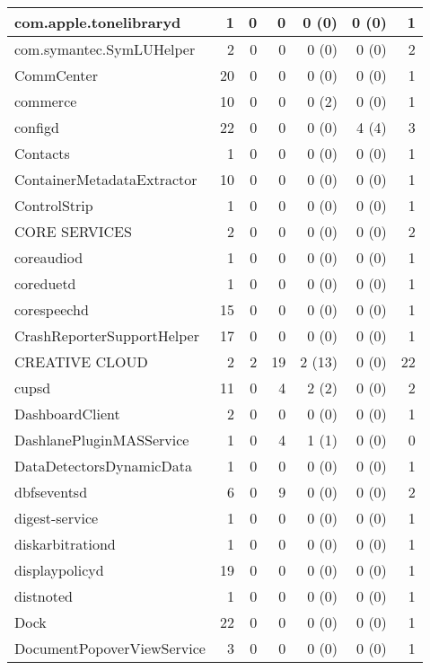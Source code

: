 \begin{adjustwidth}{-2in}{}
\begin{scriptsize}
\begin{longtable}[l]{ l | r | r | r | r | r | r }
    com.apple.tonelibraryd & 1 &  0 &  0 &  0 (0) &  0 (0) &  1 \\ \hline
    com.symantec.SymLUHelper & 2 &  0 &  0 &  0 (0) &  0 (0) &  2 \\ \hline
    CommCenter &  20 &  0 &  0 &  0 (0) &  0 (0) &  1 \\ \hline
    commerce &  10 &  0 &  0 &  0 (2) &  0 (0) &  1 \\ \hline
    configd & 22 &  0 &  0 &  0 (0) &  4 (4) &  3 \\ \hline
    Contacts & 1 &  0 &  0 &  0 (0) &  0 (0) &  1 \\ \hline
    ContainerMetadataExtractor &  10 &  0 &  0 &  0 (0) &  0 (0) &  1 \\ \hline
    ControlStrip & 1 &  0 &  0 &  0 (0) &  0 (0) &  1 \\ \hline
    CORE SERVICES &  2 &  0 &  0 &  0 (0) &  0 (0) &  2 \\ \hline
    coreaudiod & 1 &  0 &  0 &  0 (0) &  0 (0) &  1 \\ \hline
    coreduetd &  1 &  0 &  0 &  0 (0) &  0 (0) &  1 \\ \hline
    corespeechd & 15 &  0 &  0 &  0 (0) &  0 (0) &  1 \\ \hline
    CrashReporterSupportHelper &  17 &  0 &  0 &  0 (0) &  0 (0) &  1 \\ \hline
    CREATIVE CLOUD & 2 &  2 & 19 & 2 (13) &  0 (0) & 22 \\ \hline
    cupsd & 11 &  0 &  4 &  2 (2) &  0 (0) &  2 \\ \hline
    DashboardClient &  2 &  0 &  0 &  0 (0) &  0 (0) &  1 \\ \hline
    DashlanePluginMASService & 1 &  0 &  4 &  1 (1) &  0 (0) &  0 \\ \hline
    DataDetectorsDynamicData & 1 &  0 &  0 &  0 (0) &  0 (0) &  1 \\ \hline
    dbfseventsd &  6 &  0 &  9 &  0 (0) &  0 (0) &  2 \\ \hline
    digest-service & 1 &  0 &  0 &  0 (0) &  0 (0) &  1 \\ \hline
    diskarbitrationd & 1 &  0 &  0 &  0 (0) &  0 (0) &  1 \\ \hline
    displaypolicyd &  19 &  0 &  0 &  0 (0) &  0 (0) &  1 \\ \hline
    distnoted &  1 &  0 &  0 &  0 (0) &  0 (0) &  1 \\ \hline
    Dock &  22 &  0 &  0 &  0 (0) &  0 (0) &  1 \\ \hline
    DocumentPopoverViewService & 3 &  0 &  0 &  0 (0) &  0 (0) &  1 \\ \hline

\end{longtable}
\end{scriptsize}
\end{adjustwidth}
